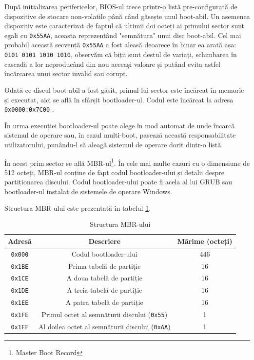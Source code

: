 \documentclass[12pt,a4paper,titlepage]{report}
\begin{document}
După inițializarea perifericelor, BIOS-ul trece printr-o listă pre-configurată de dispozitive de stocare non-volatile
până când găsește unul boot-abil. Un asemenea dispozitiv este caracterizat de faptul că ultimii doi octeți ai primului sector sunt egali cu \texttt{0x55AA}, aceasta reprezentând "semnătura" unui disc boot-abil.
Cel mai probabil această secvență \texttt{0x55AA} a fost aleasă deoarece în binar ea arată așa: \texttt{0101 0101 1010 1010}, observăm că biții sunt destul de variați, schimbarea în cascadă a lor neproducând din nou aceeași valoare și putând evita astfel încărcarea unui sector invalid sau corupt.

Odată ce discul boot-abil a fost găsit, primul lui sector este încărcat în memorie și executat, aici se află în sfârșit bootloader-ul. Codul este încărcat la adresa \texttt{0x0000:0x7C00} \cite{biosMBRaddr}.

În urma execuției bootloader-ul poate alege în mod automat de unde încarcă sistemul de operare sau, în cazul multi-boot, pasează această responsabilitate utilizatorului, punându-l să aleagă sistemul de operare dorit dintr-o listă.

În acest prim sector se află MBR-ul\footnote{Master Boot Record}. În cele mai multe cazuri cu o dimensiune de 512 octeți, MBR-ul conține de fapt codul bootloader-ului și detalii despre partiționarea discului\cite{norton99}. Codul bootloader-ului poate fi acela al lui GRUB sau bootloader-ul instalat de sistemele de operare Windows.

Structura MBR-ului este prezentată în tabelul \ref{mbrStruct}.

\begin{table}[h]
    \begin{tabular}{ | c | c | c | }
        \hline
        \textbf{Adresă} & \textbf{Descriere} & \textbf{Mărime (octeți)} \\ \hline
        \texttt{0x000} & Codul bootloader-ului & 446 \\ \hline
        \texttt{0x1BE} & Prima tabelă de partiție & 16 \\ \hline
        \texttt{0x1CE} & A doua tabelă de partiție & 16 \\ \hline        
        \texttt{0x1DE} & A treia tabelă de partiție & 16 \\ \hline
        \texttt{0x1EE} & A patra tabelă de partiție & 16 \\ \hline
        \texttt{0x1FE} & Primul octet al semnăturii discului (\texttt{0x55}) & 1 \\ \hline
        \texttt{0x1FF} & Al doilea octet al semnăturii discului (\texttt{0xAA}) & 1 \\ \hline
    \end{tabular}
    \centering
    \caption{Structura MBR-ului}
    \label{mbrStruct}
\end{table}
\end{document}
